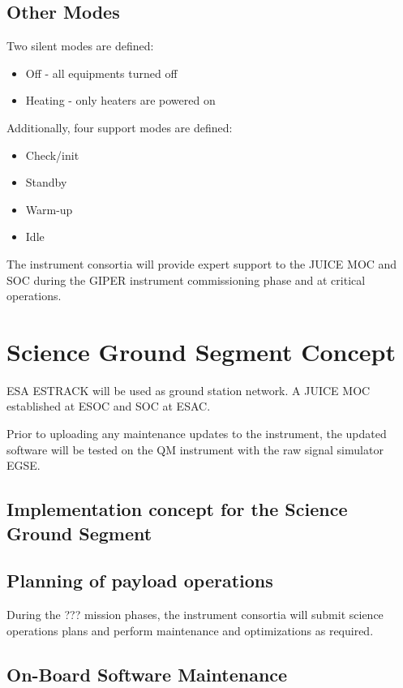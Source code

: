 \subsection{Other Modes}
%
Two silent modes are defined:
\begin{itemize}
\item Off - all equipments turned off
\item Heating - only heaters are powered on
\end{itemize}
%
Additionally, four support modes are defined: 
\begin{itemize}
\item Check/init
\item Standby
\item Warm-up
\item Idle
\end{itemize}
%
The instrument consortia will provide expert support to the JUICE \ac{MOC} and \ac{SOC} during the \ac{GIPER} instrument commissioning phase and at critical operations.
%
\section{Science Ground Segment Concept}
ESA ESTRACK will be used as ground station network. A JUICE \ac{MOC} established at ESOC and \ac{SOC} at ESAC.

Prior to uploading any maintenance updates to the instrument, the updated software will be tested on the \ac{QM} instrument with the raw signal simulator \ac{EGSE}.

\subsection{Implementation concept for the Science Ground Segment}
\subsection{Planning of payload operations}
During the ??? mission phases, the instrument consortia will submit science operations plans and perform maintenance and optimizations as required.
\subsection{On-Board Software Maintenance}
%

